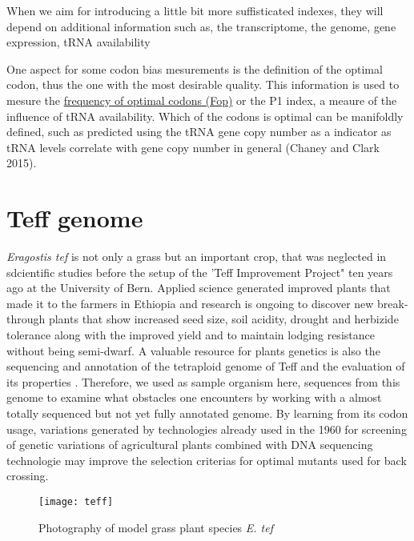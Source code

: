 When we aim for introducing a little bit more suffisticated indexes, they will depend on additional information such as, the transcriptome, the genome, gene expression, tRNA availability

One aspect for some codon bias mesurements is the definition of the optimal codon, thus the one with the most desirable quality. This information is used to mesure the \hyperlink{function:Fop}{frequency of optimal codons (Fop)} or the P1 index, a meaure of the influence of tRNA availability. Which of the codons is optimal can be manifoldly defined, such as predicted using the tRNA gene copy number as a indicator as tRNA levels correlate with gene copy number in general \cite{Chaney2015}(Chaney and Clark 2015).

\section{Teff genome}
\textit{Eragostis tef} is not only a grass but an important crop, that was neglected in sdcientific studies before the setup of the 'Teff Improvement Project" ten years ago at the University of Bern. Applied science generated improved plants that made it to the farmers in Ethiopia and research is ongoing to discover new break-through plants that show increased seed size, soil acidity, drought and herbizide tolerance along with the improved yield and to maintain lodging resistance without being semi-dwarf. A valuable resource for plants genetics is also the sequencing and annotation of the tetraploid genome of Teff and the evaluation of its properties \cite{cannarozzi2014genome}. Therefore, we used as sample organism here, sequences from this genome to examine what obstacles one encounters by working with a almost totally sequenced but not yet fully annotated genome. By learning from its codon usage, variations generated by technologies already used in the 1960 for screening of genetic variations of agricultural plants combined with DNA sequencing technologie may improve the selection criterias for optimal mutants used for back crossing. 

\begin{figure}[tb] 
\centering 
\texttt{[image: teff]} 
\caption[\textit{Eragostis tef} growing in culture room]{Photography of model grass plant species \textit{E. tef}}
\label{fig:teff} 
\end{figure}


